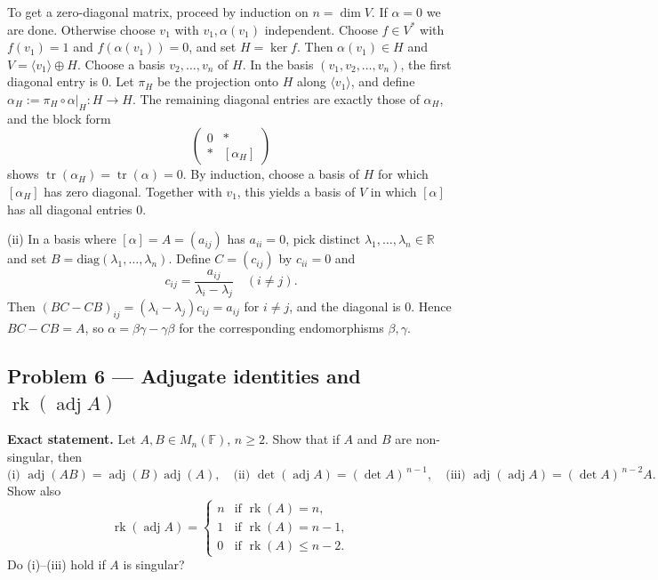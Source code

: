 \documentclass[12pt,a4paper]{article}
\theoremstyle{plain}
\theoremstyle{definition}      %
\begin{document}
To get a zero-diagonal matrix, proceed by induction on \(n=\dim V\). If \(\alpha=0\) we are done. Otherwise choose \(v_1\) with
\(v_1,\alpha(v_1)\) independent. Choose \(f\in V^*\) with \(f(v_1)=1\) and \(f(\alpha(v_1))=0\), and set \(H=\ker f\).
Then \(\alpha(v_1)\in H\) and \(V=\langle v_1\rangle\oplus H\). Choose a basis \(v_2,\dots,v_n\) of \(H\).
In the basis \((v_1,v_2,\dots,v_n)\), the first diagonal entry is \(0\). Let \(\pi_H\) be the projection onto \(H\) along \(\langle v_1\rangle\),
and define \(\alpha_H:=\pi_H\circ \alpha|_H:H\to H\). The remaining diagonal entries are exactly those of \(\alpha_H\), and the block form
\[
\begin{pmatrix}
	0 & *\\
	* & [\alpha_H]
\end{pmatrix}
\]
shows \(\operatorname{tr}(\alpha_H)=\operatorname{tr}(\alpha)=0\). By induction, choose a basis of \(H\) for which \([\alpha_H]\) has zero diagonal.
Together with \(v_1\), this yields a basis of \(V\) in which \([\alpha]\) has all diagonal entries \(0\).

(ii) In a basis where \([\alpha]=A=(a_{ij})\) has \(a_{ii}=0\), pick distinct \(\lambda_1,\dots,\lambda_n\in\mathbb R\) and set
\(B=\mathrm{diag}(\lambda_1,\dots,\lambda_n)\). Define \(C=(c_{ij})\) by \(c_{ii}=0\) and
\[
c_{ij}=\frac{a_{ij}}{\lambda_i-\lambda_j}\quad (i\neq j).
\]
Then \((BC-CB)_{ij}=(\lambda_i-\lambda_j)c_{ij}=a_{ij}\) for \(i\neq j\), and the diagonal is \(0\). Hence \(BC-CB=A\),
so \(\alpha=\beta\gamma-\gamma\beta\) for the corresponding endomorphisms \(\beta,\gamma\).

\subsection*{Problem 6 — Adjugate identities and \(\operatorname{rk}(\operatorname{adj}A)\)}

\textbf{Exact statement.}
Let \(A,B\in M_n(\mathbb F)\), \(n\ge2\). Show that if \(A\) and \(B\) are non-singular, then
\[
\text{(i) }\operatorname{adj}(AB)=\operatorname{adj}(B)\operatorname{adj}(A),\quad
\text{(ii) }\det(\operatorname{adj}A)=(\det A)^{\,n-1},\quad
\text{(iii) }\operatorname{adj}(\operatorname{adj}A)=(\det A)^{\,n-2}A.
\]
Show also
\[
\operatorname{rk}(\operatorname{adj}A)=
\begin{cases}
	n & \text{if }\operatorname{rk}(A)=n,\\
	1 & \text{if }\operatorname{rk}(A)=n-1,\\
	0 & \text{if }\operatorname{rk}(A)\le n-2.
\end{cases}
\]
Do (i)--(iii) hold if \(A\) is singular?
\end{document}
